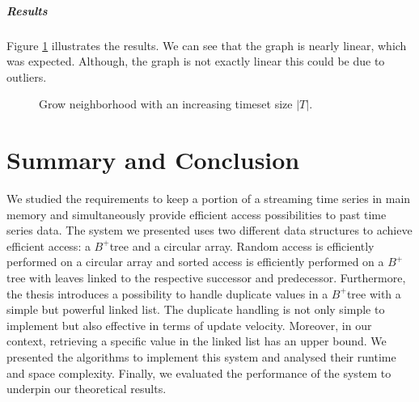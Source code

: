 \documentclass[abstracton,12pt,oneside]{scrreprt}
\begin{document}
\paragraph{Results}
Figure \ref{fig:sorted} illustrates the results. We can see that the graph is nearly linear, which was expected. Although, the graph is not exactly linear this could be due to outliers.

\begin{figure}[H]
	\centering
	\caption{Grow neighborhood with an increasing timeset size $|T|$.} \label{fig:sorted}
\end{figure}

\chapter{Summary and Conclusion}
\label{sec:Summary}
We studied the requirements to keep a portion of a streaming time series in main memory and simultaneously provide efficient access possibilities to past time series data. The system we presented uses two different data structures to achieve efficient access: a $B^+$tree and a circular array. Random access is efficiently performed on a circular array and sorted access is efficiently performed on a $B^+$tree with leaves linked to the respective successor and predecessor. Furthermore, the thesis introduces a possibility to handle duplicate values in a $B^+$tree with a simple but powerful linked list. The duplicate handling is not only simple to implement but also effective in terms of update velocity. Moreover, in our context, retrieving a specific value in the linked list has an upper bound. We presented the algorithms to implement this system and analysed their runtime and space complexity. Finally, we evaluated the performance of the system to underpin our theoretical results.
\end{document}
